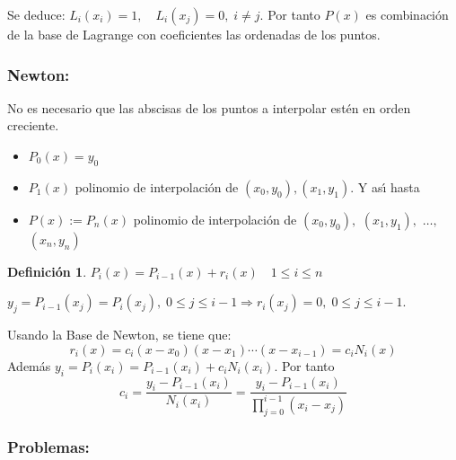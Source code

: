 \documentclass[ebook,oneside]{memoir}
\newtheorem{defn}[thm]{Definición}
\begin{document}
Se deduce: $L_i(x_i)=1,\quad L_i(x_j)=0, \;i\neq j.$ Por tanto $P(x)$ es combinaci\'{o}n de la base de Lagrange con coeficientes las ordenadas de los puntos.

\subsubsection{Newton:}

No es necesario que las abscisas de los puntos a interpolar est\'{e}n en orden creciente.

\begin{itemize}
\item $P_0(x)=y_0$
\item $P_1(x)$ polinomio de interpolaci\'{o}n de $(x_0,y_0), (x_1,y_1).$ Y as\'{\i} hasta
\item $P(x):=P_n(x)$ polinomio de interpolaci\'{o}n de $(x_0,y_0),$ $(x_1,y_1),$ $\ldots,$ $(x_n,y_n)$
\end{itemize}

\begin{defn}
$P_i(x)=P_{i-1}(x)+r_i(x) \quad 1\leq i\leq n$
\end{defn}

\vspace{0.3cm}

$y_j=P_{i-1}(x_j)=P_i(x_j), \; 0\leq j\leq i-1 \Rightarrow r_i(x_j)=0,\; 0\leq j\leq i-1.$

Usando la Base de Newton, se tiene que:
$$r_i(x)=c_i(x-x_0)(x-x_1)\cdots (x-x_{i-1})=c_iN_i(x)$$
Adem\'{a}s $y_i=P_i(x_i)=P_{i-1}(x_i)+c_i N_i(x_i).$ Por tanto
$$c_i=\frac{y_i-P_{i-1}(x_i)}{N_i(x_i)}=\frac{y_i-P_{i-1}(x_i)}{\prod_{j=0}^{i-1} (x_i-x_j)}$$

\subsubsection{Problemas:}
\end{document}

